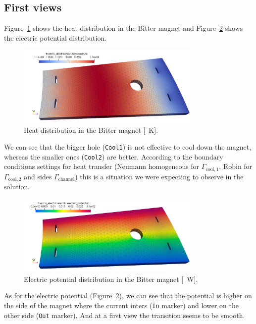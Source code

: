 \documentclass[12pt]{article}
\begin{document}
\subsection{First views}
Figure~\ref{fig:heat_distribution} shows the heat distribution in the Bitter magnet
and Figure~\ref{fig:electric_potential} shows the electric potential distribution.
\begin{figure}[H]
  \centering
  \includegraphics[width=0.8\textwidth]{images/heat.png}
  \caption{Heat distribution in the Bitter magnet [\SI{}{\kelvin}].}
  \label{fig:heat_distribution}
\end{figure}

We can see that the bigger hole (\texttt{Cool1}) is not effective to cool down the magnet, whereas
the smaller ones (\texttt{Cool2}) are better.
According to the boundary conditions settings for heat transfer (Neumann homogeneous
  for $\Gamma_{\text{cool},1}$, Robin for $\Gamma_{\text{cool},2}$ and sides
$\Gamma_{\text{channel}}$) this is a situation we were expecting to observe
in the solution.

\begin{figure}[H]
  \centering
  \includegraphics[width=0.8\textwidth]{images/electric_potential.png}
  \caption{Electric potential distribution in the Bitter magnet [\SI{}{\watt}].}
  \label{fig:electric_potential}
\end{figure}

As for the electric potential (Figure~\ref{fig:electric_potential}), we can see that
the potential is higher on the side of the magnet where the current inters (\texttt{In} marker)
and lower on the other side (\texttt{Out} marker). And at a first view the transition
seems to be smooth.
\end{document}

